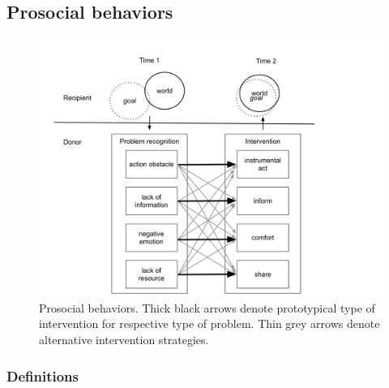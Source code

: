\documentclass{article}
\begin{document}
\subsection{Prosocial behaviors}

\begin{figure}
\center
\includegraphics[width=0.9\columnwidth]{figs/prosocial_behaviours.png}
\caption{Prosocial behaviors. Thick black arrows denote prototypical type of
intervention for respective type of problem. Thin grey arrows denote
alternative intervention strategies.}
\label{fig-prosocial}
\end{figure}

\subsubsection{Definitions}
\end{document}
